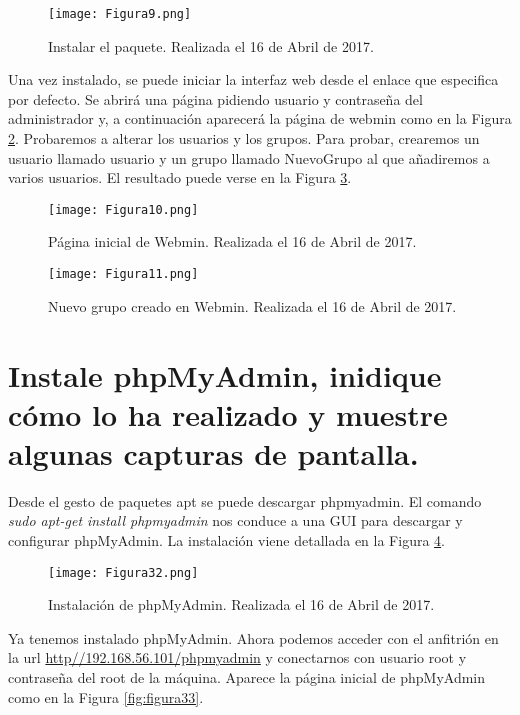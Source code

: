 \begin{figure}[H] 
\centering
\texttt{[image: Figura9.png]}  
\caption{Instalar el paquete. Realizada el 16 de Abril de 2017.} \label{fig:figura9}
\end{figure}

Una vez instalado, se puede iniciar la interfaz web desde el enlace que especifica por defecto. Se abrirá una página pidiendo usuario y contraseña del administrador y,
a continuación aparecerá la página de webmin como en la Figura \ref{fig:figura10}. Probaremos a alterar los usuarios y los grupos. Para probar, crearemos un usuario 
llamado usuario y un grupo llamado NuevoGrupo al que añadiremos a varios usuarios. El resultado puede verse en la Figura \ref{fig:figura11}.

\begin{figure}[H] 
\centering
\texttt{[image: Figura10.png]}  
\caption{Página inicial de Webmin. Realizada el 16 de Abril de 2017.} \label{fig:figura10}
\end{figure}

\begin{figure}[H] 
\centering
\texttt{[image: Figura11.png]}  
\caption{Nuevo grupo creado en Webmin. Realizada el 16 de Abril de 2017.} \label{fig:figura11}
\end{figure}



\section{Instale phpMyAdmin, inidique cómo lo ha realizado y muestre algunas capturas de pantalla.}

Desde el gesto de paquetes apt se puede descargar phpmyadmin. El comando \textit{sudo apt-get install phpmyadmin} nos conduce a una GUI para descargar y
configurar phpMyAdmin. La instalación viene detallada en la Figura \ref{fig:figura32}.

\begin{figure}[H] 
\centering
\texttt{[image: Figura32.png]}  
\caption{Instalación de phpMyAdmin. Realizada el 16 de Abril de 2017.} \label{fig:figura32}
\end{figure}

Ya tenemos instalado phpMyAdmin. Ahora podemos acceder con el anfitrión en la url \url{http//192.168.56.101/phpmyadmin} y conectarnos con usuario root y contraseña del root de la máquina. Aparece la página inicial de phpMyAdmin como en la Figura \ref{fig:figura33}.

